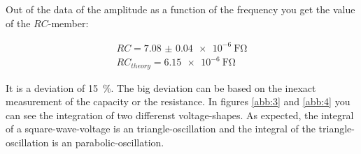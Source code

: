 Out of the data of the amplitude as a function of the frequency you get the
value of the $RC$-member:

\begin{align*}
  RC = \SI{7.08(4)e-6}{\farad\ohm} \\
  RC_{theory}= \SI{6.15e-6}{\farad\ohm}
\end{align*}

It is a deviation of \SI{15}{\percent}. The big deviation can be based on
the inexact measurement of the capacity or the resistance.
In figures \ref{abb:3} and \ref{abb:4} you can see the integration of two
differenst voltage-shapes. As expected, the integral of a square-wave-voltage is an
triangle-oscillation and the integral of the triangle-oscillation is an
parabolic-oscillation.



\printbibliography
